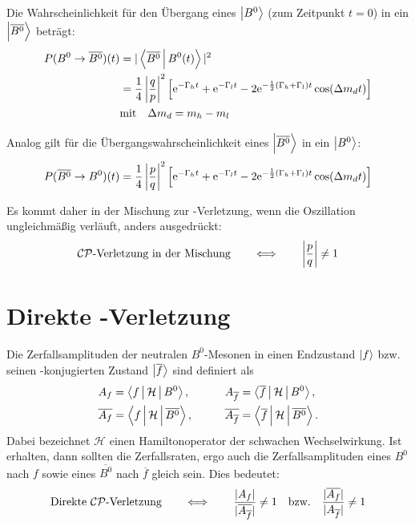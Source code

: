 Die Wahrscheinlichkeit für den Übergang eines $\Ket{B^0}$ (zum Zeitpunkt $t=0$) in ein $\Ket{\overline{B^0}}$ beträgt:
\begin{align}
\nonumber P(B^0\rightarrow\overline{B^0})(t) &= |\Braket{\overline{B^0}|B^0(t)}|^2 \\
                                        &= \frac{1}{4} \left|\frac{q}{p}\right|^2 \left[\mathrm{e}^{-\Gamma_h t} + \mathrm{e}^{-\Gamma_l t} - 2\mathrm{e}^{-\frac{1}{2}(\Gamma_h + \Gamma_l) t}\cos(\Delta m_d t)\right] \\
&\text{mit} \quad \Delta m_d = m_h - m_l
\end{align}

Analog gilt für die Übergangswahrscheinlichkeit eines $\Ket{\overline{B^0}}$ in ein $\Ket{B^0}$:
\begin{align}
P(\overline{B^0}\rightarrow B^0)(t) = \frac{1}{4} \left|\frac{p}{q}\right|^2 \left[\mathrm{e}^{-\Gamma_h t} + \mathrm{e}^{-\Gamma_l t} - 2\mathrm{e}^{-\frac{1}{2}(\Gamma_h + \Gamma_l) t}\cos(\Delta m_d t)\right] 
\end{align}

Es kommt daher in der Mischung zur \CP-Verletzung, wenn die Oszillation ungleichmäßig verläuft, anders ausgedrückt:
\begin{align}
\text{$\mathcal{CP}$-Verletzung in der Mischung} \qquad \Longleftrightarrow \qquad \left|\frac{p}{q}\right| \neq 1 
\end{align}

\section{Direkte \CP-Verletzung}
Die Zerfallsamplituden der neutralen $B^0$-Mesonen in einen Endzustand $\Ket{f}$ bzw. seinen \CP-konjugierten Zustand $\Ket{\overline{f}}$ sind definiert als
\begin{alignat}{2}
\nonumber A_f &= \Braket{f|\mathcal{H}|B^0}, && \qquad A_{\overline{f}} = \Braket{\overline{f}|\mathcal{H}|B^0}, \\
          \overline{A_f} &= \Braket{f|\mathcal{H}|\overline{B^0}}, && \qquad  \overline{A_{\overline{f}}} = \Braket{\overline{f}|\mathcal{H}|\overline{B^0}}. \label{eq:decay_amplitudes}
\end{alignat}
Dabei bezeichnet $\mathcal{H}$ einen Hamiltonoperator der schwachen Wechselwirkung. Ist \CP erhalten, dann sollten die Zerfallsraten, ergo auch die Zerfallsamplituden eines $B^0$ nach $f$ sowie eines $\overline{B^0}$ nach $\overline{f}$ gleich sein. Dies bedeutet:
\begin{align}
\text{Direkte $\mathcal{CP}$-Verletzung} \qquad \Longleftrightarrow \qquad \frac{|A_f|}{|\overline{A_{\overline{f}}}|} \neq 1 \quad \text{bzw.} \quad \frac{|\overline{A_f}|}{|A_{\overline{f}}|} \neq 1
\end{align}


